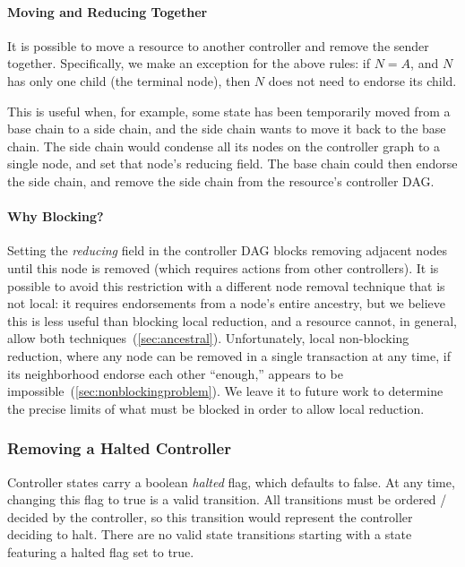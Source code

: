 \documentclass[a4paper,USenglish,cleveref, autoref, thm-restate, anonymous]{lipics-v2021}
\begin{document}
\paragraph{Moving and Reducing Together}
It is possible to move a resource to another controller and remove the sender together. 
Specifically, we make an exception for the above rules: if $N=A$, and $N$ has only one child (the terminal node), then $N$ does not need to endorse its child. 

This is useful when, for example, some state has been temporarily moved from a base chain to a side chain, and the side chain wants to move it back to the base chain.
The side chain would condense all its nodes on the controller graph to a single node, and set that node's reducing field. 
The base chain could then endorse the side chain, and remove the side chain from the resource's controller DAG. 

\paragraph{Why Blocking?}
Setting the \textit{reducing} field in the controller DAG blocks removing adjacent nodes until this node is removed (which requires actions from other controllers).
It is possible to avoid this restriction with a different node removal technique that is not local: it requires endorsements from a node's entire ancestry, but we believe this is less useful than blocking local reduction, and a resource cannot, in general, allow both techniques~(\cref{sec:ancestral}).
Unfortunately, local non-blocking reduction, where any node can be removed in a single transaction at any time, if its neighborhood endorse each other ``enough,'' appears to be impossible~(\cref{sec:nonblockingproblem}).
We leave it to future work to determine the precise limits of what must be blocked in order to allow local reduction.



\subsubsection{Removing a Halted Controller}
Controller states carry a boolean \textit{halted} flag, which defaults to false. 
At any time, changing this flag to true is a valid transition.
All transitions must be ordered / decided by the controller, so this transition would represent the controller deciding to halt. 
There are no valid state transitions starting with a state featuring a halted flag set to true. 
\end{document}
